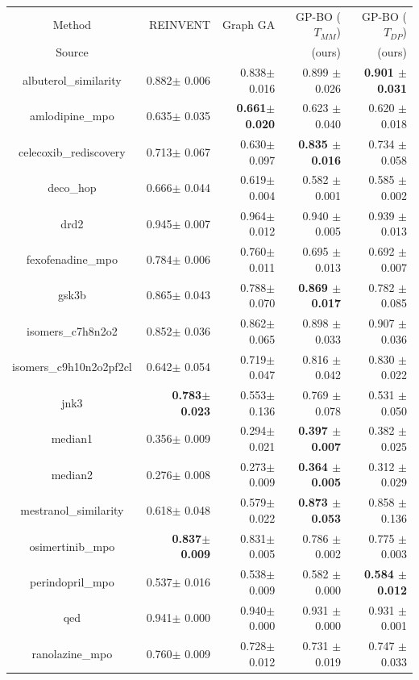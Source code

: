 \documentclass{article}
\theoremstyle{plain}
\theoremstyle{definition}
\theoremstyle{remark}
\begin{document}
\begin{table}
\begin{tabular}{c|rrrr}
  \toprule
    Method & REINVENT & Graph GA & GP-BO ($T_{MM}$) & GP-BO ($T_{DP}$)  \\
    Source & \citet{gao2022sample} & \citet{gao2022sample} & (ours) & (ours)  \\
    \midrule
    albuterol\_similarity & 0.882$\pm$ 0.006 & 0.838$\pm$ 0.016 &0.899 $\pm$ 0.026&\textbf{0.901 $\pm$ 0.031}\\
    amlodipine\_mpo & 0.635$\pm$ 0.035 & \textbf{0.661$\pm$ 0.020} &0.623 $\pm$ 0.040&0.620 $\pm$ 0.018\\
    celecoxib\_rediscovery & 0.713$\pm$ 0.067 & 0.630$\pm$ 0.097 &\textbf{0.835 $\pm$ 0.016}&0.734 $\pm$ 0.058\\
    deco\_hop & 0.666$\pm$ 0.044 & 0.619$\pm$ 0.004 &0.582 $\pm$ 0.001&0.585 $\pm$ 0.002\\
    drd2 & 0.945$\pm$ 0.007 & 0.964$\pm$ 0.012 &0.940 $\pm$ 0.005&0.939 $\pm$ 0.013\\
    fexofenadine\_mpo & 0.784$\pm$ 0.006 & 0.760$\pm$ 0.011 &0.695 $\pm$ 0.013&0.692 $\pm$ 0.007\\
    gsk3b & 0.865$\pm$ 0.043 & 0.788$\pm$ 0.070 &\textbf{0.869 $\pm$ 0.017}&0.782 $\pm$ 0.085\\
    isomers\_c7h8n2o2 & 0.852$\pm$ 0.036 & 0.862$\pm$ 0.065 &0.898 $\pm$ 0.033&0.907 $\pm$ 0.036\\
    isomers\_c9h10n2o2pf2cl & 0.642$\pm$ 0.054 & 0.719$\pm$ 0.047 &0.816 $\pm$ 0.042&0.830 $\pm$ 0.022\\
    jnk3 & \textbf{0.783$\pm$ 0.023} & 0.553$\pm$ 0.136 &0.769 $\pm$ 0.078&0.531 $\pm$ 0.050\\
    median1 & 0.356$\pm$ 0.009 & 0.294$\pm$ 0.021 &\textbf{0.397 $\pm$ 0.007}&0.382 $\pm$ 0.025\\
    median2 & 0.276$\pm$ 0.008 & 0.273$\pm$ 0.009 &\textbf{0.364 $\pm$ 0.005}&0.312 $\pm$ 0.029\\
    mestranol\_similarity & 0.618$\pm$ 0.048 & 0.579$\pm$ 0.022 &\textbf{0.873 $\pm$ 0.053}&0.858 $\pm$ 0.136\\
    osimertinib\_mpo & \textbf{0.837$\pm$ 0.009} & 0.831$\pm$ 0.005 &0.786 $\pm$ 0.002&0.775 $\pm$ 0.003\\
    perindopril\_mpo & 0.537$\pm$ 0.016 & 0.538$\pm$ 0.009 &0.582 $\pm$ 0.000&\textbf{0.584 $\pm$ 0.012}\\
    qed & 0.941$\pm$ 0.000 & 0.940$\pm$ 0.000 &0.931 $\pm$ 0.000&0.931 $\pm$ 0.001\\
    ranolazine\_mpo & 0.760$\pm$ 0.009 & 0.728$\pm$ 0.012 &0.731 $\pm$ 0.019& 0.747 $\pm$ 0.033\\

\end{tabular}
\end{table}
\end{document}
